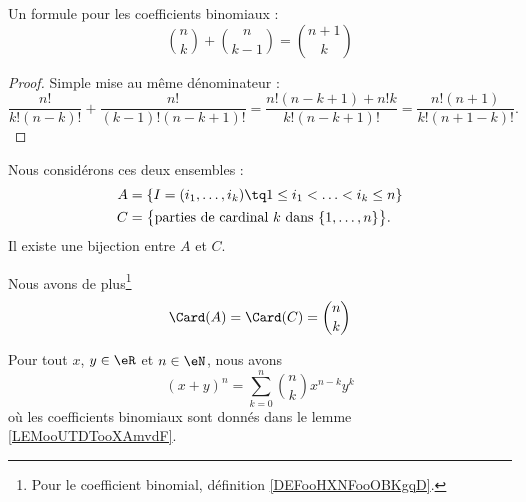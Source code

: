 \begin{lemma}		\label{LEMooHWMNooIINsxu}
	Un formule pour les coefficients binomiaux :
	\begin{equation}
		{n\choose k}+{n\choose k-1}={n+1\choose k}
	\end{equation}
\end{lemma}

\begin{proof}
	Simple mise au même dénominateur :
	\begin{equation}
		\frac{ n! }{ k!(n-k)! }+\frac{ n! }{ (k-1)!(n-k+1)! }=\frac{ n!(n-k+1)+n!k }{ k!(n-k+1)! }=\frac{ n!(n+1) }{  k!(n+1-k)!  }.
	\end{equation}
\end{proof}

\begin{lemma}		\label{LEMooUTDTooXAmvdF}
	Nous considérons ces deux ensembles :
	\begin{subequations}
		\begin{align}
			A & =\{ I=(i_1,\ldots,i_k)\tq 1\leq i_1<\ldots <i_k\leq n \}                     \\
			C & =\big\{ \text{parties de cardinal \( k\) dans \( \{ 1,\ldots,n \}\)} \big\}.
		\end{align}
	\end{subequations}
	Il existe une bijection entre \( A\) et \( C\).

	Nous avons de plus\footnote{Pour le coefficient binomial, définition \ref{DEFooHXNFooOBKgqD}.}
	\begin{equation}        \label{EQooSPVNooHoPnOe}
		\Card(A)=\Card(C)={n\choose k}
	\end{equation}
\end{lemma}


\begin{proposition}     \label{PropBinomFExOiL}
	Pour tout \( x\), \( y\in\eR\) et \( n\in\eN\), nous avons
	\begin{equation}        \label{EqNewtonB}
		(x+y)^n=\sum_{k=0}^n{n\choose k}x^{n-k}y^k
	\end{equation}
	où les coefficients binomiaux sont donnés dans le lemme \ref{LEMooUTDTooXAmvdF}.
\end{proposition}

